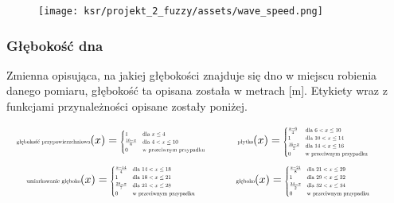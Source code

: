 \documentclass{article}
\begin{document}
\begin{figure}[H]
\centering
\texttt{[image: ksr/projekt\_2\_fuzzy/assets/wave\_speed.png]}
\label{fig:epsilon_bat}
\end{figure}

\subsubsection{Głębokość dna}

\noindent Zmienna opisująca, na jakiej głębokości znajduje się dno w miejscu robienia danego pomiaru, głębokość ta opisana została w metrach [m]. Etykiety wraz z funkcjami przynależności opisane zostały poniżej.

\begin{equation*}
\begin{minipage}{0.5\textwidth}
\centering
$\text{\scalebox{0.5}{głębokość przypowierzchniowa}}(x) =
\scalebox{0.5}{$
\begin{cases}
1 & \text{dla } x \leq 4 \\
\frac{10 - x}{6} & \text{dla } 4 < x \leq 10 \\
0 & \text{w przeciwnym przypadku}
\end{cases}
$}$
\end{minipage}%
\begin{minipage}{0.5\textwidth}
\centering
$\text{\scalebox{0.5}{płytko}}(x) =
\scalebox{0.5}{$
\begin{cases}
\frac{x - 6}{4} & \text{dla } 6 < x \leq 10 \\
1 & \text{dla } 10 < x \leq 14 \\
\frac{16 - x}{2} & \text{dla } 14 < x \leq 16 \\
0 & \text{w przeciwnym przypadku}
\end{cases}
$}$
\end{minipage}
\end{equation*}
\begin{equation*}
\begin{minipage}{0.5\textwidth}
\centering
$\text{\scalebox{0.5}{umiarkowanie głęboko}}(x) =
\scalebox{0.5}{$
\begin{cases}
\frac{x - 14}{4} & \text{dla } 14 < x \leq 18 \\
1 & \text{dla } 18 < x \leq 21 \\
\frac{28 - x}{7} & \text{dla } 21 < x \leq 28 \\
0 & \text{w przeciwnym przypadku}
\end{cases}
$}$
\end{minipage}%
\begin{minipage}{0.5\textwidth}
\centering
$\text{\scalebox{0.5}{głęboko}}(x) =
\scalebox{0.5}{$
\begin{cases}
\frac{x - 21}{8} & \text{dla } 21 < x \leq 29 \\
1 & \text{dla } 29 < x \leq 32 \\
\frac{34 - x}{2} & \text{dla } 32 < x \leq 34 \\
0 & \text{w przeciwnym przypadku}
\end{cases}
$}$
\end{minipage}
\end{equation*}
\end{document}
